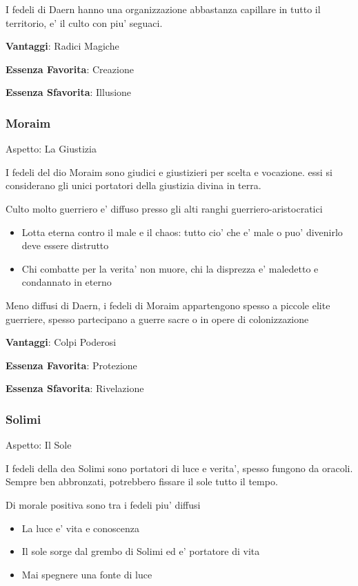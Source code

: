 \documentclass[a4paper,11pt,twoside,openany]{book}
\begin{document}
I fedeli di Daern hanno una organizzazione abbastanza capillare in tutto il territorio, e' il culto con piu' seguaci.


\textbf{Vantaggi}: Radici Magiche

\textbf{Essenza Favorita}: Creazione

\textbf{Essenza Sfavorita}: Illusione

\bigskip
\subsubsection{Moraim}

Aspetto: La Giustizia
\bigskip


I fedeli del dio Moraim sono giudici e giustizieri per scelta e vocazione. essi si considerano gli unici portatori della giustizia divina in terra.


Culto molto guerriero e' diffuso presso gli alti ranghi guerriero-aristocratici

\begin{itemize}
	\item Lotta eterna contro il male e il chaos: tutto cio' che e' male o puo' divenirlo deve essere distrutto
	\item Chi combatte per la verita' non muore, chi la disprezza e' maledetto e condannato in eterno
\end{itemize}

Meno diffusi di Daern, i fedeli di Moraim appartengono spesso a piccole elite guerriere, spesso partecipano a guerre sacre o in opere di colonizzazione 


\textbf{Vantaggi}: Colpi Poderosi

\textbf{Essenza Favorita}: Protezione

\textbf{Essenza Sfavorita}: Rivelazione

\bigskip
\subsubsection{Solimi}

Aspetto: Il Sole
\bigskip

I fedeli della dea Solimi sono portatori di luce e verita', spesso fungono da oracoli. Sempre ben abbronzati, potrebbero fissare il sole tutto il tempo.

Di morale positiva sono tra i fedeli piu' diffusi

\begin{itemize}
	\item La luce e' vita e conoscenza
	\item Il sole sorge dal grembo di Solimi ed e' portatore di vita
	\item Mai spegnere una fonte di luce
\end{itemize}
\end{document}

